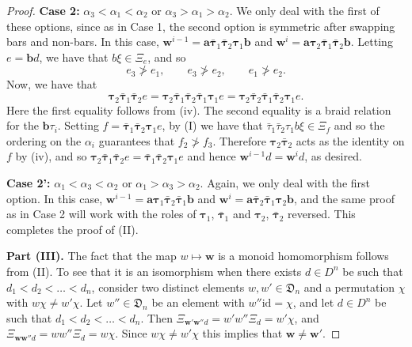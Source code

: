 \documentclass[11pt]{article}
\newcommand{\al}{\alpha}
\newcommand{\id}{\text{id}}
\newcommand{\bw}{\mathbf{w}}
\newcommand{\ba}{\mathbf{a}}
\newcommand{\bb}{\mathbf{b}}
\theoremstyle{definition} %
\theoremstyle{remark} %
\newcommand{\btau}{{\boldsymbol \tau}}
\newcommand{\bbtau}{\bar {\boldsymbol \tau}}
\begin{document}
\begin{proof}
	\textbf{Case 2:} $\al_3 < \al_1 < \al_2$ or $\al_3 > \al_1 > \al_2$. \qquad We only deal with the first of these options, since as in Case 1, the second option is symmetric after swapping bars and non-bars. In this case, $\bw^{i-1} = \ba  \bbtau_1 \bbtau_2 \btau_1 \bb$ and $\bw^{i} = \ba  \btau_2\bbtau_1 \bbtau_2 \bb$. Letting $e = \bb d$, we have that $b \xi \in \Xi_e$, and so
	$$
	e_3 \not > e_1, \qquad e_3 \not > e_2, \qquad e_1 \not > e_2.
	$$
	Now, we have that
	$$
	\btau_2\bbtau_1 \bbtau_2 e = \btau_2\bbtau_1 \bbtau_2 \bbtau_1 \btau_1 e = \btau_2\bbtau_2 \bbtau_1 \bbtau_2 \btau_1 e.
	$$
	Here the first equality follows from (iv). The second equality is a braid relation for the $\bb\tau_i$. Setting $f = \bbtau_1 \bbtau_2 \btau_1 e$, by (I) we have that $\bar \tau_1 \bar \tau_2 \tau_1 b \xi \in \Xi_f$ and so the ordering on the $\al_i$ guarantees that $f_2 \not > f_3$. Therefore $\btau_2\bbtau_2$ acts as the identity on $f$ by (iv), and so $\btau_2\bbtau_1 \bbtau_2 e = \bbtau_1 \bbtau_2 \btau_1 e$ and hence $\bw^{i-1} d = \bw^i d$, as desired.
	
	\textbf{Case 2':} $\al_1 < \al_3 < \al_2$ or $\al_1 > \al_3 > \al_2$. \qquad Again, we only deal with the first option. In this case, $\bw^{i-1} = \ba  \btau_1 \bbtau_2 \bbtau_1 \bb$ and $\bw^{i} = \ba  \bbtau_2\bbtau_1 \btau_2 \bb$, and the same proof as in Case 2 will work with the roles of $\btau_1$, $\bbtau_1$ and $\btau_2$, $\bbtau_2$ reversed. This completes the proof of (II).
	
	\textbf{Part (III).} \qquad The fact that the map $w \mapsto \bw$ is a monoid homomorphism follows from (II). To see that it is an isomorphism when there exists $d \in D^n$ be such that $d_1 < d_2 < \dots < d_n$, consider two distinct elements $w, w' \in \mathfrak{D}_n$ and a permutation $\chi$ with $w \chi \ne w' \chi$. Let $w'' \in \mathfrak{D}_n$ be an element with $w'' \id = \chi$, and let $d \in D^n$ be such that $d_1 < d_2 < \dots < d_n$. Then $\Xi_{\bw' \bw'' d} = w' w'' \Xi_d = w' \chi$, and $\Xi_{\bw \bw'' d} = w w'' \Xi_d = w \chi$. Since $w \chi \ne w' \chi$ this implies that $\bw \ne \bw'$.
\end{proof}
\end{document}
